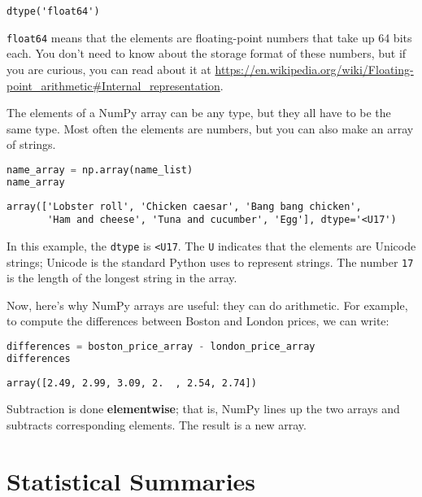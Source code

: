 \begin{lstlisting}[style=output]
dtype('float64')
\end{lstlisting}

\passthrough{\lstinline!float64!} means that the elements are
floating-point numbers that take up 64 bits each. You don't need to know
about the storage format of these numbers, but if you are curious, you
can read about it at
\url{https://en.wikipedia.org/wiki/Floating-point_arithmetic\#Internal_representation}.

The elements of a NumPy array can be any type, but they all have to be
the same type. Most often the elements are numbers, but you can also
make an array of strings.

\begin{lstlisting}[language=Python,style=source]
name_array = np.array(name_list)
name_array
\end{lstlisting}

\begin{lstlisting}[style=output]
array(['Lobster roll', 'Chicken caesar', 'Bang bang chicken',
       'Ham and cheese', 'Tuna and cucumber', 'Egg'], dtype='<U17')
\end{lstlisting}

In this example, the \passthrough{\lstinline!dtype!} is
\passthrough{\lstinline!<U17!}. The \passthrough{\lstinline!U!}
indicates that the elements are Unicode strings; Unicode is the standard
Python uses to represent strings. The number
\passthrough{\lstinline!17!} is the length of the longest string in the
array.

Now, here's why NumPy arrays are useful: they can do arithmetic. For
example, to compute the differences between Boston and London prices, we
can write:

\begin{lstlisting}[language=Python,style=source]
differences = boston_price_array - london_price_array
differences
\end{lstlisting}

\begin{lstlisting}[style=output]
array([2.49, 2.99, 3.09, 2.  , 2.54, 2.74])
\end{lstlisting}

Subtraction is done \textbf{elementwise}; that is, NumPy lines up the
two arrays and subtracts corresponding elements. The result is a new
array.

\hypertarget{statistical-summaries}{%
\section{Statistical Summaries}\label{statistical-summaries}}

